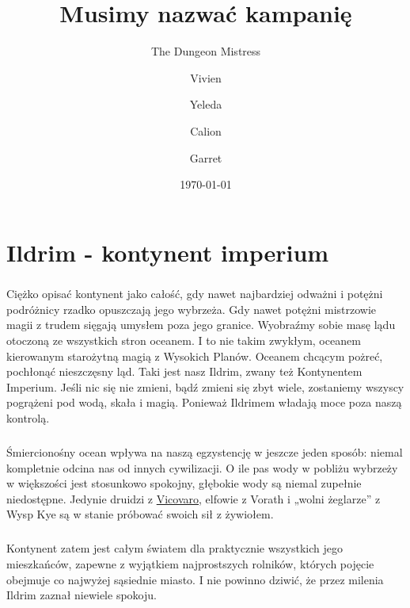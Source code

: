 \documentclass[10pt,twoside,twocolumn]{book}
\title{Musimy nazwać kampanię}
\date{\today}
\author{The Dungeon Mistress}
\author{Vivien}
\author{Yeleda}
\author{Calion}
\author{Garret}
\begin{document}
\selectfont %
\frontmatter

\maketitle
\begin{multicols}{2}
\tableofcontents
\end{multicols}

\mainmatter

\chapter{Ildrim - kontynent imperium}

\paragraph{}
Ciężko opisać kontynent jako całość, gdy nawet najbardziej odważni i potężni podróżnicy rzadko opuszczają jego wybrzeża.
Gdy nawet potężni mistrzowie magii z trudem sięgają umysłem poza jego granice. 
Wyobraźmy sobie masę lądu otoczoną ze wszystkich stron oceanem.
I to nie takim zwykłym, oceanem kierowanym starożytną magią z Wysokich Planów.
Oceanem chcącym pożreć, pochłonąć nieszczęsny ląd.
Taki jest nasz Ildrim, zwany też Kontynentem Imperium.
Jeśli nic się nie zmieni, bądź zmieni się zbyt wiele, zostaniemy wszyscy pogrążeni pod wodą, skała i magią.
Ponieważ Ildrimem władają moce poza naszą kontrolą.

\paragraph{}
Śmiercionośny ocean wpływa na naszą egzystencję w jeszcze jeden sposób: niemal kompletnie odcina nas od innych cywilizacji.
O ile pas wody w pobliżu wybrzeży w większości jest stosunkowo spokojny, głębokie wody są niemal zupełnie niedostępne.
Jedynie druidzi z \hyperref[Vicovaro]{Vicovaro}, elfowie z Vorath i „wolni żeglarze” z Wysp Kye są w stanie próbować swoich sił z żywiołem.

\paragraph{}
Kontynent zatem jest całym światem dla praktycznie wszystkich jego mieszkańców, zapewne z  wyjątkiem najprostszych rolników, których pojęcie obejmuje co najwyżej sąsiednie miasto.
I nie powinno dziwić, że przez milenia Ildrim zaznał niewiele spokoju.
\end{document}
